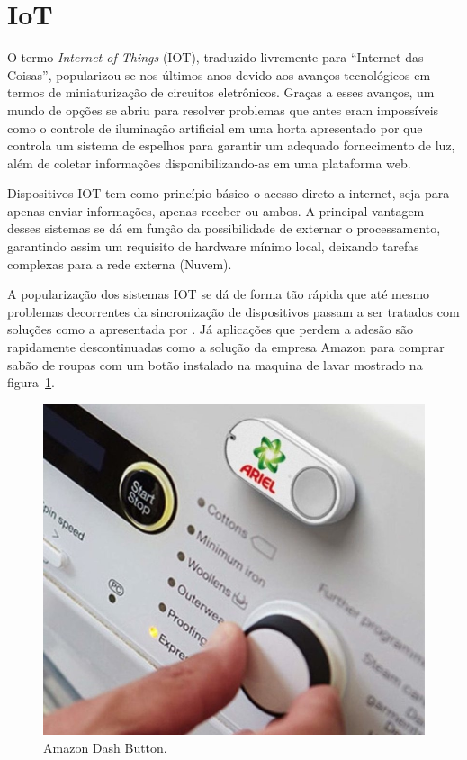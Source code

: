 \section{IoT}
O termo \textit{Internet of Things} (IOT), traduzido livremente para ``Internet das Coisas'', popularizou-se nos últimos anos devido aos avanços tecnológicos em termos de miniaturização de circuitos eletrônicos. Graças a esses avanços, um mundo de opções se abriu para resolver problemas que antes eram impossíveis como o controle de iluminação artificial em uma horta apresentado por  que controla um sistema de espelhos para garantir um adequado fornecimento de luz, além de coletar informações disponibilizando-as em uma plataforma web.

Dispositivos IOT tem como princípio básico o acesso direto a internet, seja para apenas enviar informações, apenas receber ou ambos. A principal vantagem desses sistemas se dá em função da possibilidade de externar o processamento, garantindo assim um requisito de hardware mínimo local, deixando tarefas complexas para a rede externa (Nuvem).  

A popularização dos sistemas IOT se dá de forma tão rápida que até mesmo problemas decorrentes da sincronização de dispositivos passam a ser tratados com soluções como a apresentada por . Já aplicações que perdem a adesão são rapidamente descontinuadas como a solução da empresa Amazon para comprar sabão de roupas com um botão instalado na maquina de lavar mostrado na figura~\ref{fig:amazon}.

\begin{figure}
  \caption{Amazon Dash Button.}
  \begin{center}
      \includegraphics[scale=0.6]{img/Amazon-Dash-Button.png}
  \end{center}
  \label{fig:amazon}
\end{figure}

